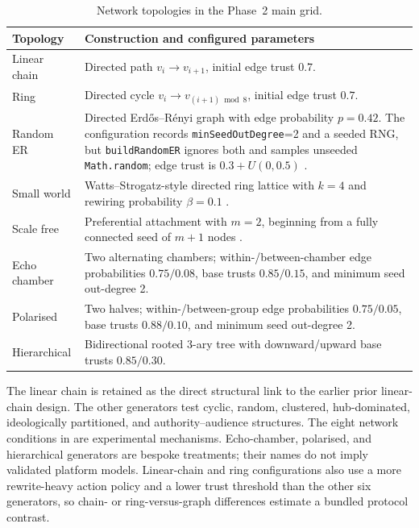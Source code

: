 \begin{table}[tbp]
  \centering
  \caption{Network topologies in the Phase~2 main grid.}
  \label{tab:simulation-topologies}
  \small
  \begin{tabularx}{\textwidth}{@{}lX@{}}
    \toprule
    Topology & Construction and configured parameters \\
    \midrule
    Linear chain &
      Directed path \(v_i\rightarrow v_{i+1}\), initial edge trust \(0.7\). \\
    Ring &
      Directed cycle \(v_i\rightarrow v_{(i+1)\bmod 8}\), initial edge trust
      \(0.7\). \\
    Random ER &
      Directed Erdős--Rényi graph with edge probability \(p=0.42\).
      The configuration records \texttt{minSeedOutDegree}=2 and a seeded RNG,
      but \texttt{buildRandomER} ignores both and samples unseeded
      \texttt{Math.random}; edge trust is \(0.3+U(0,0.5)\)
      \parencite{erdos1960evolution}. \\
    Small world &
      Watts--Strogatz-style directed ring lattice with \(k=4\) and rewiring
      probability \(\beta=0.1\) \parencite{watts1998collective}. \\
    Scale free &
      Preferential attachment with \(m=2\), beginning from a fully connected
      seed of \(m+1\) nodes \parencite{barabasi1999emergence}. \\
    Echo chamber &
      Two alternating chambers; within-/between-chamber edge probabilities
      \(0.75/0.08\), base trusts \(0.85/0.15\), and minimum seed out-degree 2. \\
    Polarised &
      Two halves; within-/between-group edge probabilities \(0.75/0.05\),
      base trusts \(0.88/0.10\), and minimum seed out-degree 2. \\
    Hierarchical &
      Bidirectional rooted 3-ary tree with downward/upward base trusts
      \(0.85/0.30\). \\
    \bottomrule
  \end{tabularx}
\end{table}

The linear chain is retained as the direct structural link to the earlier
prior linear-chain design.  The other generators test cyclic, random, clustered,
hub-dominated, ideologically partitioned, and authority--audience structures.
The eight network conditions in  are experimental
mechanisms. Echo-chamber, polarised, and hierarchical generators are bespoke
treatments; their names do not imply validated platform models. Linear-chain
and ring configurations also use a more rewrite-heavy action policy and a
lower trust threshold than the other six generators, so chain- or
ring-versus-graph differences estimate a bundled protocol contrast.

